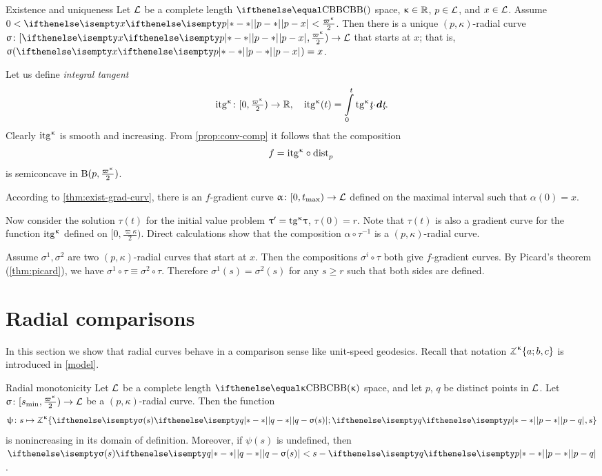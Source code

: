 \begin{thm}{Existence and uniqueness}\label{rad-curv-exist}
Let $\mathcal{L}$ be a complete length $\Alex{}$ space, 
$\kappa\in\RR$, 
$p\in\spc{L}$, 
and $x\in \spc{L}$.
Assume
$0
<
\dist{p}{x}{}
<
\tfrac{\varpi\kappa}2$.
Then there is a unique $(p,\kappa)$-radial curve $\sigma\:[\dist{p}{x}{},\tfrac{\varpi\kappa}2)\to \spc{L}$ 
that starts at $x$;
that is, $\sigma(\dist{p}{x}{})=x$.
\end{thm}


Let us define \emph{integral tangent}  
\[\itg\kappa\:[0,\tfrac{\varpi\kappa}2)\to\RR,
\quad 
\itg\kappa (t)=\int\limits_0^t\tang\kappa\under t\cdot\dd\under t.\]
Clearly $\mathrm{itg}^{\upkappa}$ is smooth and increasing.
From \ref{prop:conv-comp} it follows that the composition 
\[f=\itg\kappa\circ\distfun{p}{}{}\] 
is semiconcave in $\oBall(p,\tfrac{\varpi\kappa}2)$.

According to \ref{thm:exist-grad-curv}, there is an $f$-gradient curve $\alpha\:[0,t_{\max})\to \spc{L}$ defined on the maximal interval such that $\alpha(0)=x$.

Now consider the solution $\tau(t)$ for the initial value problem $\tau'\z=\tang\kappa\tau$, $\tau(0)=r$. 
Note that $\tau(t)$ is also a gradient curve  for the function $\mathrm{itg}^{\upkappa}$ defined on $[0,\tfrac{\varpi\kappa}2)$.
Direct calculations show that the composition $\alpha\circ\tau^{-1}$ 
is a $(p,\kappa)$-radial curve.

 Assume $\sigma^1,\sigma^2$ are two $(p,\kappa)$-radial curves that start at $x$.
Then the compositions $\sigma^i\circ\tau$ both give $f$-gradient curves.
By Picard's theorem (\ref{thm:picard}), we have
$\sigma^1\circ\tau 
\equiv 
\sigma^2\circ\tau$.
Therefore $\sigma^1(s)=\sigma^2(s)$ 
for any $s\ge r$ such that both sides are defined.
\qeds

\section{Radial comparisons}\label{sec:Radial comparisons}

In this section we show that radial curves behave in a comparison sense like unit-speed geodesics.
Recall that notation $\tangle\mc\kappa\{a;b,c\}$ is introduced in \ref{model}.

\begin{thm}{Radial monotonicity}\label{rad-mon}
Let $\mathcal{L}$ be a complete length $\Alex{\kappa}$ space, and let
$p$, $q$ be distinct points in $\mathcal{L}$.
Let $\sigma\:  [s_{\min},\tfrac{\varpi\kappa}2)\to \spc{L}$
be a $(p,\kappa)$-radial curve.
Then the function 
\[\psi\:s\mapsto 
\tangle\mc\kappa\{
\dist{q}{\sigma(s)}{};
\dist{p}{q}{},
s
\}\]
is nonincreasing in its domain of definition.
Moreover, if $\psi(s)$ is undefined, then $\dist{q}{\sigma(s)}{}<s-\dist{p}{q}{}$.
\end{thm}

